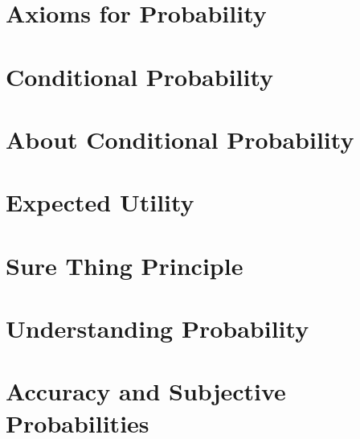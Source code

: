 \documentclass[openany]{book}
\begin{document}
\chapter{Axioms for Probability}


\chapter{Conditional Probability}


\chapter{About Conditional Probability}


\chapter{Expected Utility}


\chapter{Sure Thing Principle}


\chapter{Understanding Probability}


\chapter{Accuracy and Subjective Probabilities}


%

%

%
\end{document}
